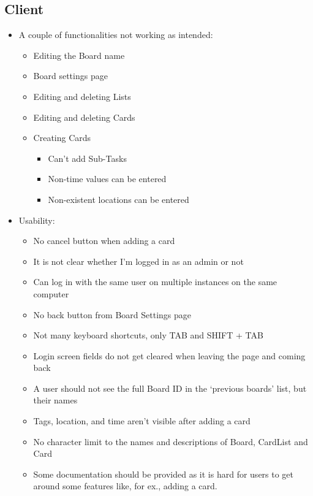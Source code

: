 \subsection{Client}
\begin{itemize}
    \item A couple of functionalities not working as intended:
    \begin{itemize}
        \item Editing the Board name
        \item Board settings page
        \item Editing and deleting Lists
        \item Editing and deleting Cards
        \item Creating Cards
        \begin{itemize}
            \item Can’t add Sub-Tasks
            \item Non-time values can be entered
            \item Non-existent locations can be entered
        \end{itemize}
    \end{itemize}
        \item Usability:
    \begin{itemize}
        \item No cancel button when adding a card
        \item It is not clear whether I’m logged in as an admin or not
        \item Can log in with the same user on multiple instances on the same computer
        \item No back button from Board Settings page
        \item Not many keyboard shortcuts, only TAB and SHIFT + TAB
        \item Login screen fields do not get cleared when leaving the page and coming back
        \item A user should not see the full Board ID in the ‘previous boards’ list, but their names
        \item Tags, location, and time aren't visible after adding a card
        \item No character limit to the names and descriptions of Board, CardList and Card
        \item Some documentation should be provided as it is hard for users to get around some features like, for ex., adding a card.
    \end{itemize}
\end{itemize}

